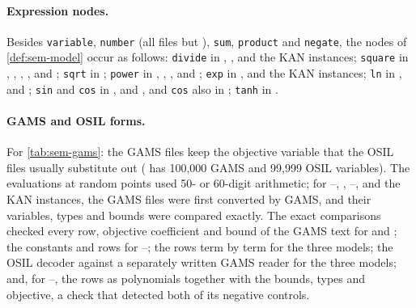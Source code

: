 \paragraph{Expression nodes.}
Besides \texttt{variable}, \texttt{number} (all files but ), \texttt{sum}, \texttt{product} and \texttt{negate}, the nodes of \cref{def:sem-model} occur as follows:
\texttt{divide} in , ,  and the KAN instances;
\texttt{square} in , , , ,  and ;
\texttt{sqrt} in ;
\texttt{power} in , , ,  and ;
\texttt{exp} in ,  and the KAN instances;
\texttt{ln} in ,  and ;
\texttt{sin} and \texttt{cos} in ,  and , and \texttt{cos} also in ;
\texttt{tanh} in .

\paragraph{GAMS and OSIL forms.}
For \cref{tab:sem-gams}: the GAMS files keep the objective variable that the OSIL files usually substitute out ( has 100,000 GAMS and 99,999 OSIL variables).
The evaluations at random points used 50- or 60-digit arithmetic; for --, , --,  and the KAN instances, the GAMS files were first converted by GAMS, and their variables, types and bounds were compared exactly.
The exact comparisons checked every row, objective coefficient and bound of the GAMS text for  and ; the constants and rows for --; the rows term by term for the three  models; the OSIL decoder against a separately written GAMS reader for the three  models; and, for --, the rows as polynomials together with the bounds, types and objective, a check that detected both of its negative controls.


